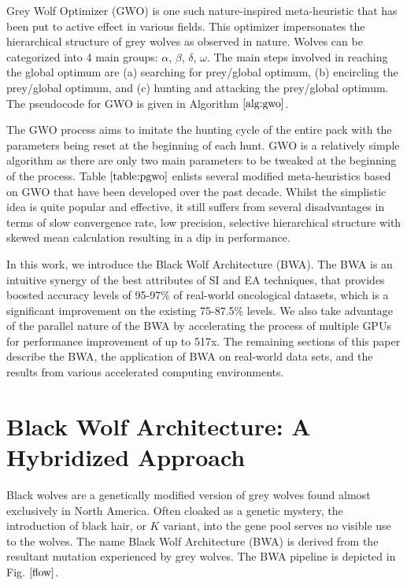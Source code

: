 \documentclass[conference]{IEEEtran}
\begin{document}
Grey Wolf Optimizer (GWO) \cite{gwo} is one such nature-inspired meta-heuristic that has been put to active effect in various fields. This optimizer impersonates the hierarchical structure of grey wolves as observed in nature. Wolves can be categorized into 4 main groups: $\alpha$, $\beta$, $\delta$, $\omega$. The main steps involved in reaching the global optimum are (a) searching for prey/global optimum, (b) encircling the prey/global optimum, and (c) hunting and attacking the prey/global optimum. The pseudocode for GWO is given in Algorithm $\ref{alg:gwo}$.

The GWO process aims to imitate the hunting cycle of the entire pack with the parameters being reset at the beginning of each hunt. GWO is a relatively simple algorithm as there are only two main parameters to be tweaked at the beginning of the process. Table $\ref{table:pgwo}$ enlists several modified meta-heuristics based on GWO that have been developed over the past decade. Whilst the simplistic idea is quite popular and effective, it still suffers from several disadvantages in terms of slow convergence rate, low precision, selective hierarchical structure with skewed mean calculation resulting in a dip in performance. 


In this work, we introduce the Black Wolf Architecture (BWA). The BWA is an intuitive synergy of the best attributes of SI and EA techniques, that provides boosted accuracy levels of 95-97\% of real-world oncological datasets, which is a significant improvement on the existing 75-87.5\% levels. We also take advantage of the parallel nature of the BWA by accelerating the process of multiple GPUs for performance improvement of up to 517x. The remaining sections of this paper describe the BWA, the application of BWA on real-world data sets, and the results from various accelerated computing environments. 

\section{Black Wolf Architecture: A Hybridized Approach}

Black wolves \cite{bwolf} are a genetically modified version of grey wolves found almost exclusively in North America. Often cloaked as a genetic mystery, the introduction of black hair, or $\textit{K}$ variant, into the gene pool serves no visible use to the wolves. The name Black Wolf Architecture (BWA) is derived from the resultant mutation experienced by grey wolves. The BWA pipeline is depicted in Fig. $\ref{flow}$.
\end{document}
